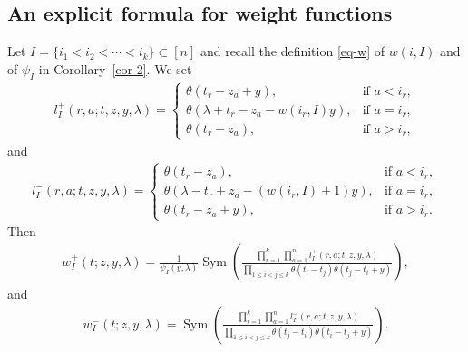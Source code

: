 \documentclass[10pt,a4paper]{amsart}
\numberwithin{equation}{section}
\begin{document}
\subsection{An explicit formula for weight functions}\label{ss-expli}
Let $I=\{i_1<i_2<\cdots<i_k\}\subset [n]$ and recall the definition \eqref{eq-w} of $w(i,I)$ and of $\psi_I$ in Corollary~\ref{cor-2}. We set
\begin{gather*}
 l^+_I(r,a;t,z,y,\lambda) =
 \begin{cases}
 \theta(t_r-z_a+y),& \text{if $a<i_r$}, \\
 \theta(\lambda+t_r-z_a-w(i_r,I)y), & \text{if $a=i_r$}, \\
 \theta(t_r-z_a), & \text{if $a>i_r$},
 \end{cases}
\end{gather*}
and
\begin{gather*}
 l^-_I(r,a;t,z,y,\lambda) =
 \begin{cases}
 \theta(t_r-z_a),& \text{if $a<i_r$}, \\
 \theta(\lambda-t_r+z_a-(w(i_r,I)+1)y), & \text{if $a=i_r$}, \\
 \theta(t_r-z_a+y), & \text{if $a>i_r$}.
 \end{cases}
\end{gather*}
Then
\begin{gather*}
 w^+_I(t;z,y,\lambda)=\frac{1}{\psi_I(y,\lambda)}\operatorname{Sym} \left( \frac { \prod\limits_{r=1}^k\prod\limits_{a=1}^nl^+_I(r,a;t,z,y,\lambda) } {\prod\limits_{1\leq i<j\leq k}\theta(t_i-t_j)\theta(t_j-t_i+y)}\right),
\end{gather*}
and
\begin{gather*}
 w^-_I(t;z,y,\lambda)=\operatorname{Sym}\left( \frac { \prod\limits_{r=1}^k\prod\limits_{a=1}^nl^-_I(r,a;t,z,y,\lambda) } {\prod\limits_{1\leq i<j\leq k}\theta(t_j-t_i)\theta(t_i-t_j+y)}\right).
\end{gather*}
\end{document}
